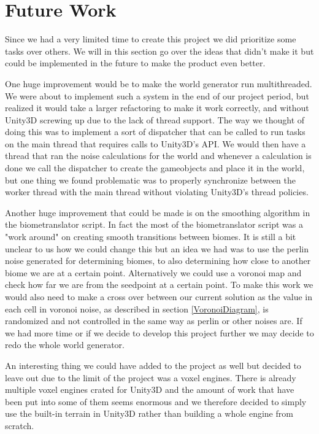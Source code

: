 \section{Future Work}
\label{cha:FutureWork}
Since we had a very limited time to create this project we did prioritize some tasks over others. We will in this section go over the ideas that didn't make it but could be implemented in the future to make the product even better. 

One huge improvement would be to make the world generator run multithreaded. We were about to implement such a system in the end of our project period, but realized it would take a larger refactoring to make it work correctly, and without Unity3D screwing up due to the lack of thread support. The way we thought of doing this was to implement a sort of dispatcher that can be called to run tasks on the main thread that requires calls to Unity3D's API. We would then have a thread that ran the noise calculations for the world and whenever a calculation is done we call the dispatcher to create the gameobjects and place it in the world, but one thing we found problematic was to properly synchronize between the worker thread with the main thread without violating Unity3D's thread policies.

Another huge improvement that could be made is on the smoothing algorithm in the biometranslator script. In fact the most of the biometranslator script was a "work around" on creating smooth transitions between biomes. It is still a bit unclear to us how we could change this but an idea we had was to use the perlin noise generated for determining biomes, to also determining how close to another biome we are at a certain point. Alternatively we could use a voronoi map and check how far we are from the seedpoint at a certain point. To make this work we would also need to make a cross over between our current solution as the value in each cell in voronoi noise, as described in section \ref{VoronoiDiagram}, is randomized and not controlled in the same way as perlin or other noises are. If we had more time or if we decide to develop this project further we may decide to redo the whole world generator.

An interesting thing we could have added to the project as well but decided to leave out due to the limit of the project was a voxel engines. There is already multiple voxel engines crated for Unity3D and the amount of work that have been put into some of them seems enormous and we therefore decided to simply use the built-in terrain in Unity3D rather than building a whole engine from scratch.

